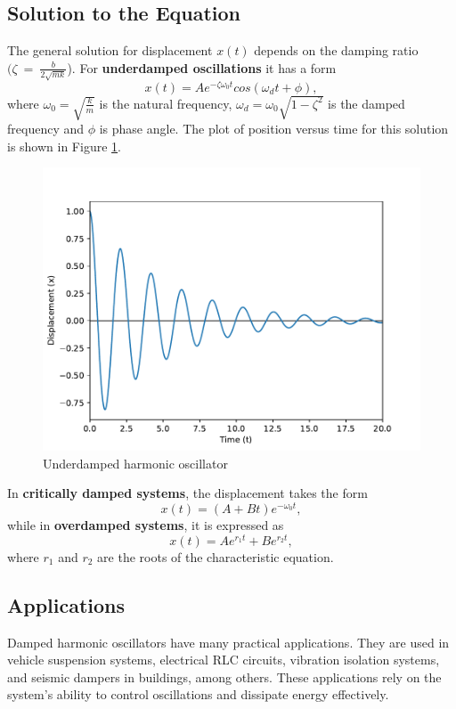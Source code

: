 \documentclass{article}
\begin{document}
\subsection{Solution to the Equation}
The general solution for displacement ${x(t)}$ depends on the damping ratio $(\zeta~=~\frac{b}{2\sqrt{mk}}$).
For \textbf{underdamped oscillations} it has a form
\begin{equation}
    x(t)=Ae^{-\zeta\omega_0t}cos(\omega_dt+\phi),
\end{equation}
where $\omega_0 = \sqrt{\frac{k}{m}}$ is the natural frequency, $\omega_d = \omega_0 \sqrt{1 - \zeta^2}$ is the damped frequency and $\phi$ is phase angle. The plot of position versus time for this solution is shown in Figure \ref{fig:Graph}.
\begin{figure}
    \centering
    \includegraphics[width=0.7\linewidth]{dhs.pdf}
    \caption{Underdamped harmonic oscillator}
    \label{fig:Graph}
\end{figure}

In \textbf{critically damped systems}, the displacement takes the form 
\begin{equation}
    x(t)=(A+Bt)e^{-\omega_0t},
\end{equation}
while in \textbf{overdamped systems}, it is expressed as 
\begin{equation}
    x(t)=Ae^{r_1t}+Be^{r_2t},
\end{equation}
where $r_1$ and $r_2$ are the roots of the characteristic equation.

\subsection{Applications}
Damped harmonic oscillators have many practical applications. They are used in vehicle suspension systems, electrical RLC circuits, vibration isolation systems, and seismic dampers in buildings, among others. These applications rely on the system's ability to control oscillations and dissipate energy effectively.
\end{document}

